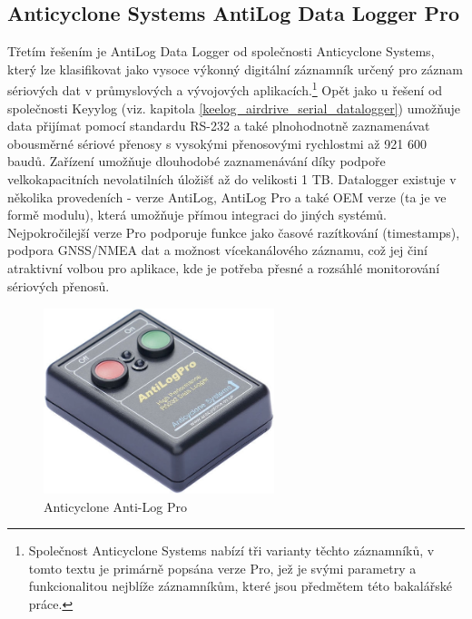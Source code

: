 \subsection{Anticyclone Systems AntiLog Data Logger Pro}
\label{anticyclone_systems_antilog_data_logger}
Třetím řešením je AntiLog Data Logger od společnosti Anticyclone Systems, který lze klasifikovat jako vysoce výkonný digitální záznamník určený pro záznam sériových dat v průmyslových a vývojových aplikacích.\footnote{Společnost Anticyclone Systems nabízí tři varianty těchto záznamníků, v tomto textu je primárně popsána verze Pro, jež je svými parametry a funkcionalitou nejblíže záznamníkům, které jsou předmětem této bakalářské práce.} Opět jako u řešení od společnosti Keyylog (viz. kapitola \ref{keelog_airdrive_serial_datalogger}) umožňuje data přijímat pomocí standardu RS-232 a také plnohodnotně zaznamenávat obousměrné sériové přenosy s vysokými přenosovými rychlostmi až 921 600 baudů. Zařízení umožňuje dlouhodobé zaznamenávání díky podpoře velkokapacitních nevolatilních úložišť až do velikosti 1 TB. Datalogger existuje v několika provedeních - verze AntiLog, AntiLog Pro a také OEM verze (ta je ve formě modulu), která umožňuje přímou integraci do jiných systémů. Nejpokročilejší verze Pro podporuje funkce jako časové razítkování (timestamps), podpora GNSS/NMEA dat a možnost vícekanálového záznamu, což jej činí atraktivní volbou pro aplikace, kde je potřeba přesné a rozsáhlé monitorování sériových přenosů. \cite{anticyclone_systems_antilog_pro}

\begin{figure}[h]
    \centering
    \includegraphics[width=0.6\textwidth]{obrazky-figures/antilogpro.png}
    
    \caption{Anticyclone Anti-Log Pro \cite{anticyclone_systems_antilog_pro_price}}
    \label{fig:sparkfun-openlog-use-case}
\end{figure}

